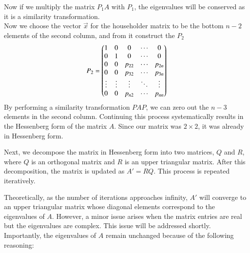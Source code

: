 \documentclass[journal]{IEEEtran}
\begin{document}
Now if we multiply the matrix $P_1A$ with $P_1$, the eigenvalues will be conserved as it is a similarity transformation.\\
Now we choose the vector $\vec{x}$ for the householder matrix to be the bottom $n-2$ elements of the second column, and from it construct the $P_2$
\begin{align}
P_2 = \begin{pmatrix}
1 & 0 & 0 & \cdots & 0 \\
0 & 1 & 0 & \cdots & 0 \\
0 & 0 & p_{22} & \cdots & p_{2n} \\
0 & 0 & p_{32} & \cdots & p_{3n} \\
\vdots & \vdots & \vdots & \ddots & \vdots \\
0 & 0 & p_{n2} & \cdots & p_{nn}
\end{pmatrix}
\end{align}
By performing a similarity transformation $PAP$, we can zero out the $n-3$ elements in the second column. Continuing this process systematically results in the Hessenberg form of the matrix $A$. Since our matrix was $2 \times 2$, it was already in Hessenberg form. 

Next, we decompose the matrix in Hessenberg form into two matrices, $Q$ and $R$, where $Q$ is an orthogonal matrix and $R$ is an upper triangular matrix. After this decomposition, the matrix is updated as $A' = RQ$. This process is repeated iteratively. 

Theoretically, as the number of iterations approaches infinity, $A'$ will converge to an upper triangular matrix whose diagonal elements correspond to the eigenvalues of $A$. However, a minor issue arises when the matrix entries are real but the eigenvalues are complex. This issue will be addressed shortly. Importantly, the eigenvalues of $A$ remain unchanged because of the following reasoning:
\end{document}
